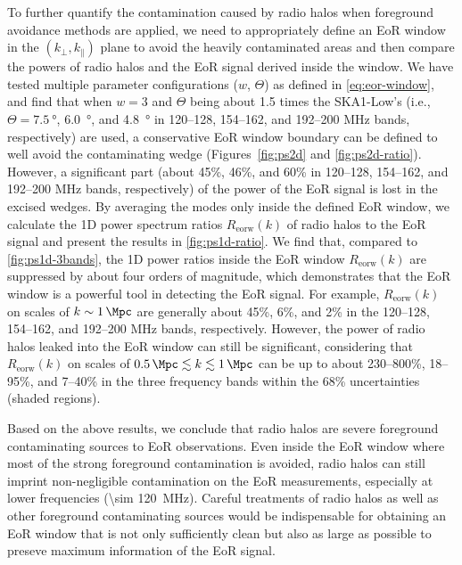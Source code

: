 \documentclass[twocolumn]{aastex62}
\newcommand{\R}[1]{\mathrm{#1}}
\newcommand{\klos}{\text{$k_{\parallel}$}}
\newcommand{\kperp}{\text{$k_{\bot}$}}
\newcommand{\fov}{\text{Fo\!V}}
\begin{document}
To further quantify the contamination caused by radio halos when
foreground avoidance methods are applied, we need to appropriately
define an EoR window in the $(\kperp, \klos)$ plane to avoid the
heavily contaminated areas and then compare the powers of radio halos
and the EoR signal derived inside the window.
We have tested multiple parameter configurations ($w$, $\Theta$) as
defined in \autoref{eq:eor-window}, and find that when $w = 3$ and
$\Theta$ being about 1.5 times the SKA1-Low's \fov{} (i.e.,
$\Theta = \SI{7.5}{\degree}$, \SI{6.0}{\degree}, and \SI{4.8}{\degree}
in \numrange{120}{128}, \numrange{154}{162}, and \numrange{192}{200}
\si{\MHz} bands, respectively) are used, a conservative EoR window
boundary can be defined to well avoid the contaminating wedge
(Figures~\ref{fig:ps2d} and \ref{fig:ps2d-ratio}).
However, a significant part (about 45\%, 46\%, and 60\% in
\numrange{120}{128}, \numrange{154}{162}, and \numrange{192}{200}
\si{\MHz} bands, respectively) of the power of
the EoR signal is lost in the excised wedges.
By averaging the modes only inside the defined EoR window, we calculate
the 1D power spectrum ratios $R_{\R{eorw}}(k)$ of radio halos to the EoR
signal and present the results in \autoref{fig:ps1d-ratio}.
We find that, compared to \autoref{fig:ps1d-3bands}, the 1D power ratios
inside the EoR window $R_{\R{eorw}}(k)$ are suppressed by about four orders
of magnitude, which demonstrates that the EoR window is a powerful tool
in detecting the EoR signal.
For example, $R_{\R{eorw}}(k)$ on scales of $k \sim \SI{1}{\per\Mpc}$ are
generally about 45\%, 6\%, and 2\% in the \numrange{120}{128},
\numrange{154}{162}, and \numrange{192}{200} \si{\MHz} bands, respectively.
However, the power of radio halos leaked into the EoR window can still be
significant, considering that $R_{\R{eorw}}(k)$ on scales of
$\SI{0.5}{\per\Mpc} \lesssim k \lesssim \SI{1}{\per\Mpc}$ can be up to
about \numrange{230}{800}\%, \numrange{18}{95}\%, and
\numrange{7}{40}\% in the three frequency bands within the
68\% uncertainties (shaded regions).

Based on the above results, we conclude that radio halos are severe
foreground contaminating sources to EoR observations.
Even inside the EoR window where most of the strong foreground
contamination is avoided, radio halos can still imprint
non-negligible contamination on the EoR measurements, especially at
lower frequencies (\SI{\sim 120}{\MHz}).
Careful treatments of radio halos as well as other foreground contaminating
sources would be indispensable for obtaining an EoR window that is not only
sufficiently clean but also as large as possible to preseve maximum
information of the EoR signal.
\end{document}
